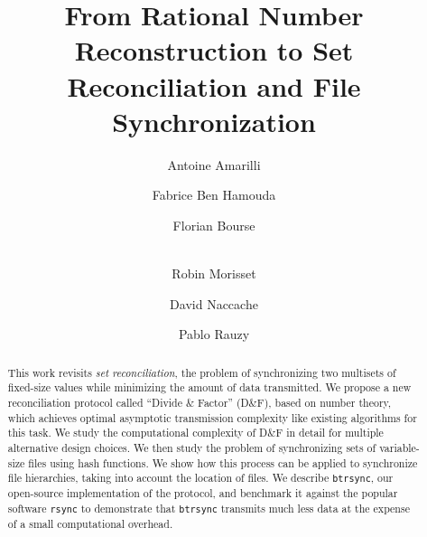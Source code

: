 \documentclass[twoside,envcountsame,runningheads]{llncs}
\newcommand{\df}{D\&F\xspace}
\newcommand{\btrsync}{\texttt{btrsync}\xspace}
\newcommand{\rsync}{\texttt{rsync}\xspace}
\begin{document}

\title{From Rational Number Reconstruction to Set Reconciliation and File
Synchronization}

\author{Antoine Amarilli \and Fabrice Ben Hamouda \and Florian Bourse \and\\
Robin Morisset \and David Naccache \and Pablo Rauzy}



\maketitle

\begin{abstract}
  This work revisits \textit{set reconciliation}, the problem of synchronizing two multisets of fixed-size values while minimizing the amount of data transmitted. We propose a new reconciliation protocol called ``Divide \& Factor'' (\df), based on number theory, which achieves optimal asymptotic transmission complexity like existing algorithms for this task. We study the computational complexity of \df in detail for multiple alternative design choices. We then study the problem of synchronizing sets of variable-size files using hash functions. We show how this process can be applied to synchronize file hierarchies, taking into account the location of files. We describe \btrsync, our open-source implementation of the protocol, and benchmark it against the popular software \rsync to demonstrate that \btrsync transmits much less data at the expense of a small computational overhead.
\end{abstract}

%
\end{document}
